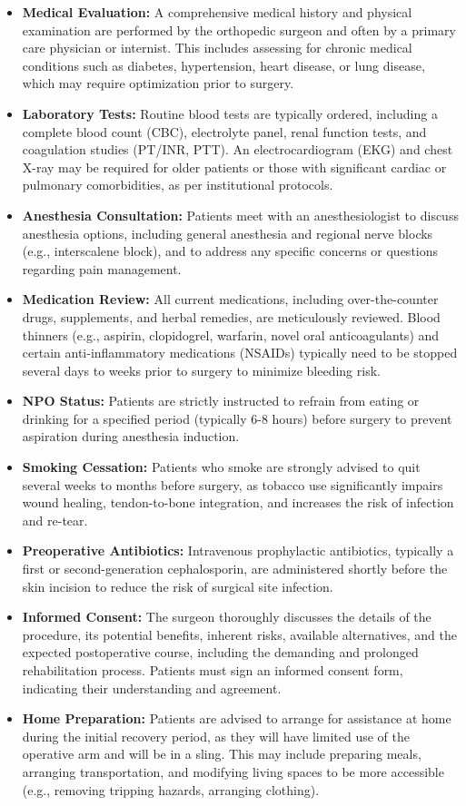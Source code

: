 \begin{itemize}
  \item \textbf{Medical Evaluation:} A comprehensive medical history and physical examination are performed by the orthopedic surgeon and often by a primary care physician or internist. This includes assessing for chronic medical conditions such as diabetes, hypertension, heart disease, or lung disease, which may require optimization prior to surgery.
  \item \textbf{Laboratory Tests:} Routine blood tests are typically ordered, including a complete blood count (CBC), electrolyte panel, renal function tests, and coagulation studies (PT/INR, PTT). An electrocardiogram (EKG) and chest X-ray may be required for older patients or those with significant cardiac or pulmonary comorbidities, as per institutional protocols.
  \item \textbf{Anesthesia Consultation:} Patients meet with an anesthesiologist to discuss anesthesia options, including general anesthesia and regional nerve blocks (e.g., interscalene block), and to address any specific concerns or questions regarding pain management.
  \item \textbf{Medication Review:} All current medications, including over-the-counter drugs, supplements, and herbal remedies, are meticulously reviewed. Blood thinners (e.g., aspirin, clopidogrel, warfarin, novel oral anticoagulants) and certain anti-inflammatory medications (NSAIDs) typically need to be stopped several days to weeks prior to surgery to minimize bleeding risk.
  \item \textbf{NPO Status:} Patients are strictly instructed to refrain from eating or drinking for a specified period (typically 6-8 hours) before surgery to prevent aspiration during anesthesia induction.
  \item \textbf{Smoking Cessation:} Patients who smoke are strongly advised to quit several weeks to months before surgery, as tobacco use significantly impairs wound healing, tendon-to-bone integration, and increases the risk of infection and re-tear.
  \item \textbf{Preoperative Antibiotics:} Intravenous prophylactic antibiotics, typically a first or second-generation cephalosporin, are administered shortly before the skin incision to reduce the risk of surgical site infection.
  \item \textbf{Informed Consent:} The surgeon thoroughly discusses the details of the procedure, its potential benefits, inherent risks, available alternatives, and the expected postoperative course, including the demanding and prolonged rehabilitation process. Patients must sign an informed consent form, indicating their understanding and agreement.
  \item \textbf{Home Preparation:} Patients are advised to arrange for assistance at home during the initial recovery period, as they will have limited use of the operative arm and will be in a sling. This may include preparing meals, arranging transportation, and modifying living spaces to be more accessible (e.g., removing tripping hazards, arranging clothing).
\end{itemize}

